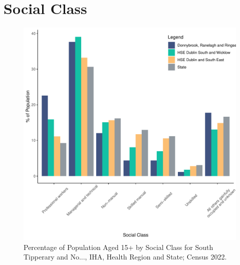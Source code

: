 \documentclass{article}
\begin{document}
\section{Social Class}\label{sect:SC}
\begin{figure}[H]
	\centering
	\includegraphics[width = 140mm]{../figures/SocialClassED.pdf}
	\caption{Percentage of Population Aged 15+ by Social Class for South Tipperary and No..., IHA, Health Region and State; Census 2022.}
	\label{fig:vbnv}
	\end{figure}
\end{document}
